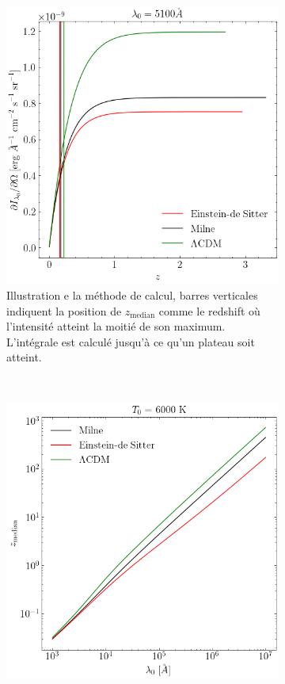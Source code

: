 \documentclass{article}
\numberwithin{equation}{section}
\begin{document}
\begin{figure}[H]
        \centering
        \begin{subfigure}[t]{0.45\textwidth}
                \includegraphics[width=\textwidth]{flux_univers}
                \caption{Illustration e la méthode de calcul, barres verticales indiquent 
                la position de $z_{\text{median}}$ comme le redshift où l'intensité atteint la 
        moitié de son maximum. L'intégrale est calculé jusqu'à ce qu'un plateau soit atteint.}
                \label{fig:flux}
        \end{subfigure}
        ~
        \begin{subfigure}[t]{0.45\textwidth}
                \includegraphics[width=\linewidth]{z_median_univers}

\end{subfigure}
\end{figure}
\end{document}
